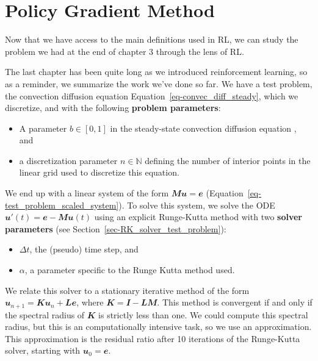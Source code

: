 \documentclass[
  letterpaper,
]{report}
\providecommand{\tightlist}{%
  \setlength{\itemsep}{0pt}\setlength{\parskip}{0pt}}\usepackage{longtable,booktabs,array}
\theoremstyle{definition}
\theoremstyle{plain}
\theoremstyle{definition}
\theoremstyle{remark}
\begin{document}

\chapter{Policy Gradient Method}\label{policy-gradient-method}

Now that we have access to the main definitions used in RL, we can study
the problem we had at the end of chapter 3 through the lens of RL.

The last chapter has been quite long as we introduced reinforcement
learning, so as a reminder, we summarize the work we've done so far. We
have a test problem, the convection diffusion equation
Equation~\ref{eq-convec_diff_steady}, which we discretize, and with the
following \textbf{problem parameters}:

\begin{itemize}
\item
  A parameter \(b \in [0,1]\) in the steady-state convection diffusion
  equation , and
\item
  a discretization parameter \(n\in\mathbb{N}\) defining the number of
  interior points in the linear grid used to discretize this equation.
\end{itemize}

We end up with a linear system of the form
\(\mathbfit{Mu} = \mathbfit{e}\)
(Equation~\ref{eq-test_problem_scaled_system}). To solve this system, we
solve the ODE \(\mathbfit{u}'(t) = \mathbfit{e} - \mathbfit{Mu}(t)\)
using an explicit Runge-Kutta method with two \textbf{solver parameters}
(see Section~\ref{sec-RK_solver_test_problem}):

\begin{itemize}
\tightlist
\item
  \(\Delta t\), the (pseudo) time step, and
\item
  \(\alpha\), a parameter specific to the Runge Kutta method used.
\end{itemize}

We relate this solver to a stationary iterative method of the form
\(\mathbfit{u}_{n+1} = \mathbfit{Ku}_n + \mathbfit{Le}\), where
\(\mathbfit{K} = \mathbfit{I}-\mathbfit{LM}\). This method is convergent
if and only if the spectral radius of \(\mathbfit{K}\) is strictly less
than one. We could compute this spectral radius, but this is an
computationally intensive task, so we use an approximation. This
approximation is the residual ratio after 10 iterations of the
Runge-Kutta solver, starting with \(\mathbfit{u}_0 = \mathbfit{e}\).
\end{document}
